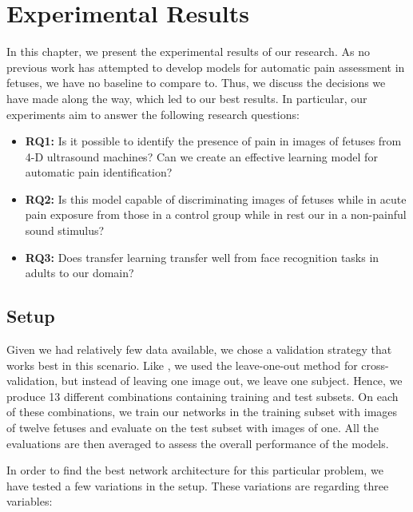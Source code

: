 \chapter{Experimental Results}

In this chapter, we present the experimental results of our research. As no previous work has attempted to develop models for automatic pain assessment in fetuses, we have no baseline to compare to. Thus, we discuss the decisions we have made along the way, which led to our best results. In particular, our experiments aim to answer the following research questions:

\begin{itemize}
    \item \textbf{RQ1:} Is it possible to identify the presence of pain in images of fetuses from 4-D ultrasound machines? Can we create an effective learning model for automatic pain identification?
    
    \item \textbf{RQ2:} Is this model capable of discriminating images of fetuses while in acute pain exposure from those in a control group while in rest our in a non-painful sound stimulus?
    
    \item \textbf{RQ3:} Does transfer learning transfer well from face recognition tasks in adults to our domain?
\end{itemize}

\section{Setup}

Given we had relatively few data available, we chose a validation strategy that works best in this scenario. Like \cite{CelonaM17}, we used the leave-one-out method for cross-validation, but instead of leaving one image out, we leave one subject. Hence, we produce 13 different combinations containing training and test subsets. On each of these combinations, we train our networks in the training subset with images of twelve fetuses and evaluate on the test subset with images of one. All the evaluations are then averaged to assess the overall performance of the models.

In order to find the best network architecture for this particular problem, we have tested a few variations in the setup. These variations are regarding three variables:

